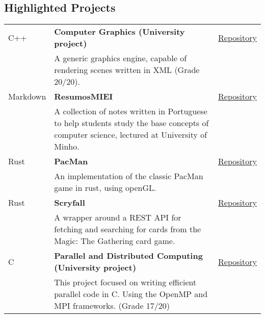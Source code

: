 \documentclass{article}
\begin{document}
\begin{textblock}{9.4}
    \section{Highlighted Projects}
    \begin{tabular}{lp{10.4cm}r}
        C++ & \textbf{Computer Graphics (University project)} & \href{https://github.com/mendess/CG}{Repository}\\
        & A generic graphics engine, capable of rendering scenes written in XML (Grade 20/20). &\\
        Markdown & \textbf{ResumosMIEI} & \href{https://github.com/mendess/ResumosMIEI}{Repository}\\
        & A collection of notes written in Portuguese to help students
        study the base concepts of computer science, lectured at University of
        Minho. &\\
        Rust & \textbf{PacMan} & \href{https://github.com/mendess/rust-pacman}{Repository}\\
        & An implementation of the classic PacMan game in rust, using openGL.\@ &\\
        Rust & \textbf{Scryfall} & \href{https://github.com/mendess/scryfall-rs}{Repository}\\
        & A wrapper around a REST API for fetching and searching for cards from
        the Magic: The Gathering\texttrademark{} card game. &\\
        C & \textbf{Parallel and Distributed Computing (University project)} &
        \href{https://github.com/mendess/CPD}{Repository}\\
        & This project focused on writing efficient parallel code in C. Using
        the OpenMP and MPI frameworks. (Grade 17/20) &\\
    \end{tabular}


\end{textblock}
\end{document}
